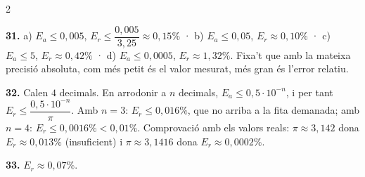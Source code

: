 \documentclass[13pt,a4paper]{extarticle}
\begin{document}
\begin{multicols}{2}
\begin{minipage}{\linewidth}
\end{minipage}\par\vspace{1.6mm}
\par\noindent\begin{minipage}{\linewidth}
\textbf{31.} a) $E_a\leq0{,}005$, $E_r\leq\dfrac{0{,}005}{3{,}25}\approx0{,}15\%$ · b) $E_a\leq0{,}05$, $E_r\approx0{,}10\%$ · c) $E_a\leq5$, $E_r\approx0{,}42\%$ · d) $E_a\leq0{,}0005$, $E_r\approx1{,}32\%$. Fixa't que amb la mateixa precisió absoluta, com més petit és el valor mesurat, més gran és l'error relatiu.\par
\end{minipage}\par\vspace{1.6mm}
\par\noindent\begin{minipage}{\linewidth}
\textbf{32.} Calen $4$ decimals. En arrodonir a $n$ decimals, $E_a\leq0{,}5\cdot10^{-n}$, i per tant $E_r\leq\dfrac{0{,}5\cdot10^{-n}}{\pi}$. Amb $n=3$: $E_r\leq0{,}016\%$, que no arriba a la fita demanada; amb $n=4$: $E_r\leq0{,}0016\%<0{,}01\%$. Comprovació amb els valors reals: $\pi\approx3{,}142$ dona $E_r\approx0{,}013\%$ (insuficient) i $\pi\approx3{,}1416$ dona $E_r\approx0{,}0002\%$.\par
\end{minipage}\par\vspace{1.6mm}
\par\noindent\begin{minipage}{\linewidth}
\textbf{33.} $E_r\approx0{,}07\%$.\par


\end{minipage}
\end{multicols}
\end{document}
